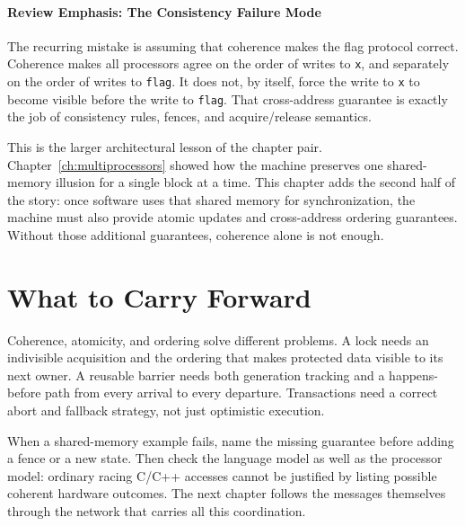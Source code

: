 \paragraph{Review Emphasis: The Consistency Failure Mode}\label{par:ch9-review-consistency-failure}
The recurring mistake is assuming that coherence makes the flag protocol correct.
Coherence makes all processors agree on the order of writes to \texttt{x}, and separately on the order of writes to \texttt{flag}.
It does not, by itself, force the write to \texttt{x} to become visible before the write to \texttt{flag}.
That cross-address guarantee is exactly the job of consistency rules, fences, and acquire/release semantics.

This is the larger architectural lesson of the chapter pair.
Chapter~\ref{ch:multiprocessors} showed how the machine preserves one shared-memory illusion for a single block at a time.
This chapter adds the second half of the story: once software uses that shared memory for synchronization, the machine must also provide atomic updates and cross-address ordering guarantees.
Without those additional guarantees, coherence alone is not enough.

\section{What to Carry Forward}\label{sec:chapter9-summary}
Coherence, atomicity, and ordering solve different problems.
A lock needs an indivisible acquisition and the ordering that makes protected data visible to its next owner.
A reusable barrier needs both generation tracking and a happens-before path from every arrival to every departure.
Transactions need a correct abort and fallback strategy, not just optimistic execution.

When a shared-memory example fails, name the missing guarantee before adding a fence or a new state.
Then check the language model as well as the processor model: ordinary racing C/C++ accesses cannot be justified by listing possible coherent hardware outcomes.
The next chapter follows the messages themselves through the network that carries all this coordination.


